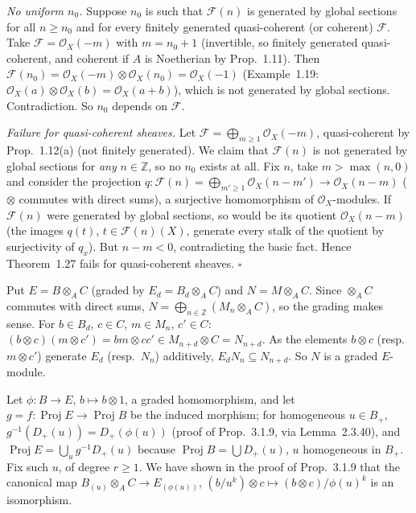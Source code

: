 \documentclass[11pt]{article}
\begin{document}
\emph{No uniform $n_0$.} Suppose $n_0$ is such that $\mathcal F(n)$ is generated by global sections for all $n\ge n_0$ and for every finitely generated quasi-coherent (or coherent) $\mathcal F$. Take $\mathcal F=\mathcal O_X(-m)$ with $m=n_0+1$ (invertible, so finitely generated quasi-coherent, and coherent if $A$ is Noetherian by Prop.~1.11). Then $\mathcal F(n_0)=\mathcal O_X(-m)\otimes\mathcal O_X(n_0)=\mathcal O_X(-1)$ (Example~1.19: $\mathcal O_X(a)\otimes\mathcal O_X(b)=\mathcal O_X(a+b)$), which is not generated by global sections. Contradiction. So $n_0$ depends on $\mathcal F$.

\emph{Failure for quasi-coherent sheaves.} Let $\mathcal F=\bigoplus_{m\ge1}\mathcal O_X(-m)$, quasi-coherent by Prop.~1.12(a) (not finitely generated). We claim that $\mathcal F(n)$ is not generated by global sections for \emph{any} $n\in\mathbb Z$, so no $n_0$ exists at all. Fix $n$, take $m>\max(n,0)$ and consider the projection $q:\mathcal F(n)=\bigoplus_{m'\ge1}\mathcal O_X(n-m')\to\mathcal O_X(n-m)$ ($\otimes$ commutes with direct sums), a surjective homomorphism of $\mathcal O_X$-modules. If $\mathcal F(n)$ were generated by global sections, so would be its quotient $\mathcal O_X(n-m)$ (the images $q(t)$, $t\in\mathcal F(n)(X)$, generate every stalk of the quotient by surjectivity of $q_x$). But $n-m<0$, contradicting the basic fact. Hence Theorem~1.27 fails for quasi-coherent sheaves. \hfill$\square$

\pf
Put $E=B\otimes_AC$ (graded by $E_d=B_d\otimes_AC$) and $N=M\otimes_AC$. Since $\otimes_A C$ commutes with direct sums, $N=\bigoplus_{n\in\mathbb Z}(M_n\otimes_AC)$, so the grading makes sense. For $b\in B_d$, $c\in C$, $m\in M_n$, $c'\in C$: $(b\otimes c)(m\otimes c')=bm\otimes cc'\in M_{n+d}\otimes C=N_{n+d}$. As the elements $b\otimes c$ (resp.\ $m\otimes c'$) generate $E_d$ (resp.\ $N_n$) additively, $E_dN_n\subseteq N_{n+d}$. So $N$ is a graded $E$-module.

Let $\phi:B\to E$, $b\mapsto b\otimes1$, a graded homomorphism, and let $g=f:\operatorname{Proj}E\to\operatorname{Proj}B$ be the induced morphism; for homogeneous $u\in B_+$, $g^{-1}(D_+(u))=D_+(\phi(u))$ (proof of Prop.~3.1.9, via Lemma~2.3.40), and $\operatorname{Proj}E=\bigcup_ug^{-1}D_+(u)$ because $\operatorname{Proj}B=\bigcup D_+(u)$, $u$ homogeneous in $B_+$. Fix such $u$, of degree $r\ge1$. We have shown in the proof of Prop.~3.1.9 that the canonical map $B_{(u)}\otimes_AC\to E_{(\phi(u))}$, $(b/u^k)\otimes c\mapsto(b\otimes c)/\phi(u)^k$ is an isomorphism.
\end{document}
